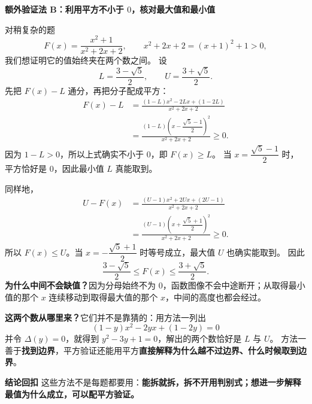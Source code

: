 \begin{proofbox}
\textbf{\textcolor{CProof}{额外验证法 B：利用平方不小于 $0$，核对最大值和最小值}}
\begin{center}\end{center}


  \medskip
  对稍复杂的题
  \[
    F(x)=\frac{x^2+1}{x^2+2x+2},\qquad
    x^2+2x+2=(x+1)^2+1>0,
  \]
  我们想证明它的值始终夹在两个数之间。
  设
  \[
    L=\frac{3-\sqrt5}{2},\qquad
    U=\frac{3+\sqrt5}{2}.
  \]
  先把 $F(x)-L$ 通分，再把分子配成平方：
  \[
    \begin{aligned}
      F(x)-L
      &=\frac{(1-L)x^2-2Lx+(1-2L)}{x^2+2x+2}\\
      &=\frac{(1-L)\left(x-\dfrac{\sqrt5-1}{2}\right)^2}
      {x^2+2x+2}\ge0.
    \end{aligned}
  \]
  因为 $1-L>0$，所以上式确实不小于 $0$，即 $F(x)\ge L$。
  当 $x=\dfrac{\sqrt5-1}{2}$ 时，平方恰好是 $0$，因此最小值 $L$ 真能取到。

  \medskip
  同样地，
  \[
    \begin{aligned}
      U-F(x)
      &=\frac{(U-1)x^2+2Ux+(2U-1)}{x^2+2x+2}\\
      &=\frac{(U-1)\left(x+\dfrac{\sqrt5+1}{2}\right)^2}
      {x^2+2x+2}\ge0.
    \end{aligned}
  \]
  所以 $F(x)\le U$。当 $x=-\dfrac{\sqrt5+1}{2}$ 时等号成立，最大值 $U$ 也确实能取到。
  因此
  \[
    \boxed{\frac{3-\sqrt5}{2}\le F(x)\le\frac{3+\sqrt5}{2}.}
  \]
  \textbf{为什么中间不会缺值？}因为分母始终不为 $0$，函数图像不会中途断开；从取得最小值的那个 $x$ 连续移动到取得最大值的那个 $x$，中间的高度也都会经过。

  \medskip
  \textbf{这两个数从哪里来？}它们并不是靠猜的：用方法一列出
  \[
    (1-y)x^2-2yx+(1-2y)=0
  \]
  并令 $\Delta(y)=0$，就得到 $y^2-3y+1=0$，解出的两个数恰好是 $L$ 与 $U$。
  方法一善于\textbf{找到边界}，平方验证还能用平方\textbf{直接解释为什么越不过边界、什么时候取到边界}。

  \medskip
  \textbf{\textcolor{CProof}{结论回扣}}
  这些方法不是每题都要用：\textbf{能拆就拆，拆不开用判别式；想进一步解释最值为什么成立，可以配平方验证。}
\end{proofbox}



